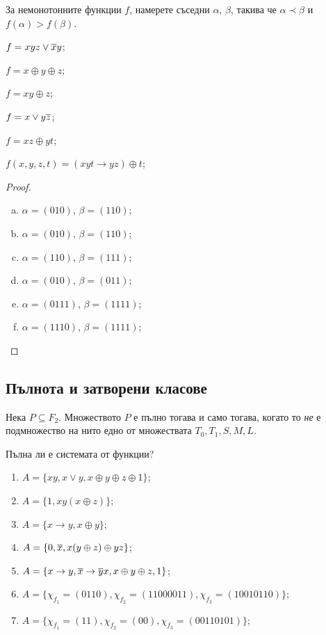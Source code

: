 \begin{problem}
  За немонотонните функции $f$, намерете съседни $\alpha$, $\beta$, такива че
  $\alpha \prec \beta$ и $f(\alpha) > f(\beta)$.\\
  \begin{inparaenum}[a)]
  \item
    $f = xyz \vee \overline{x}y$;
  \item
    $f = x\oplus y\oplus z$;
  \item
    $f = xy\oplus z$;
  \item
    $f = x\vee y\overline{z}$;
  \item
    $f = xz\oplus yt$;
  \item
    $f(x,y,z,t) = (xyt\rightarrow yz)\oplus t$;
  \end{inparaenum}
\end{problem}
\begin{proof}
  \begin{enumerate}[a)]
  \item
    $\alpha = (010)$, $\beta = (110)$;
  \item
    $\alpha = (010)$, $\beta = (110)$;
  \item
    $\alpha = (110)$, $\beta = (111)$;
  \item
    $\alpha = (010)$, $\beta = (011)$;
  \item
    $\alpha = (0111)$, $\beta = (1111)$;
  \item
    $\alpha = (1110)$, $\beta = (1111)$;
  \end{enumerate}
\end{proof}



\subsection{Пълнота и затворени класове}

\begin{thm}
  Нека $P\subseteq F_2$. Множеството $P$ е пълно тогава и само тогава, когато то {\em не} е подмножество на 
  нито едно от множествата $T_0,T_1,S,M,L$.
\end{thm}


\begin{problem} %
  Пълна ли е системата от функции?
  \begin{enumerate}[1)]
  \item
    $A = \{xy, x\vee y, x\oplus y\oplus z\oplus 1\}$;
  \item
    $A = \{1, xy(x\oplus z)\}$;
  \item
    $A = \{x\rightarrow y, x\oplus y\}$;
  \item
    $A = \{0, \overline{x}, x(y\oplus z)\oplus yz\}$;
  \item
    $A = \{x\rightarrow y, \overline{x}\rightarrow \overline{y}x, x\oplus y\oplus z, 1\}$;
  \item
    $A = \{\chi_{f_1} = (0110), \chi_{f_2} = (1100 0011), \chi_{f_3} = (1001 0110)\}$;
  \item
    $A = \{\chi_{f_1} = (11), \chi_{f_2} = (00), \chi_{f_3} = (0011 0101)\}$;
  \end{enumerate}
\end{problem}


